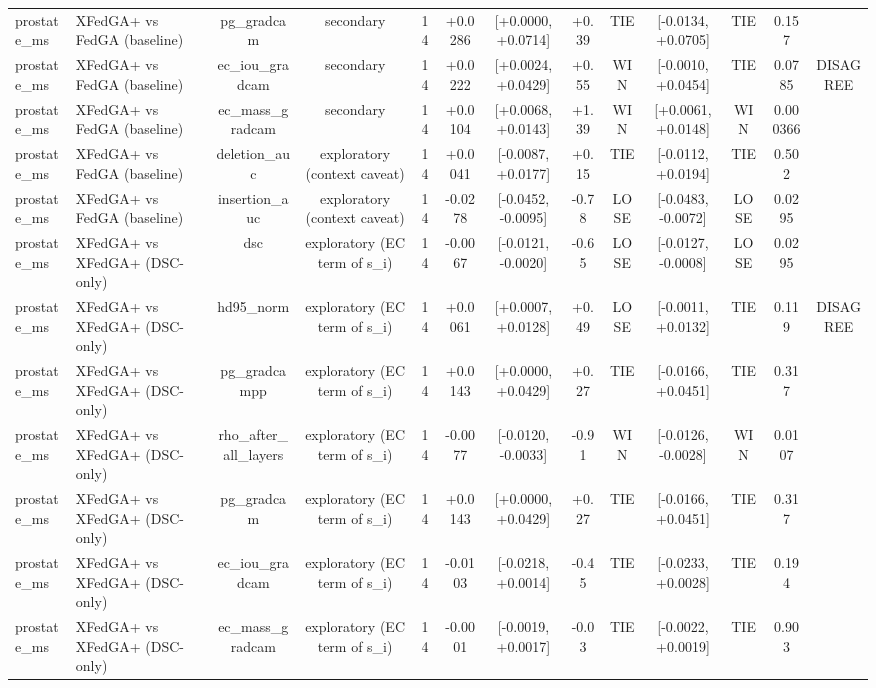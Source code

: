 \begin{tabular}{llccccccccccc}
prostate\_ms & XFedGA+ vs FedGA (baseline) & pg\_gradcam & secondary & 14 & +0.0286 & [+0.0000, +0.0714] & +0.39 & TIE & [-0.0134, +0.0705] & TIE & 0.157 &  \\
prostate\_ms & XFedGA+ vs FedGA (baseline) & ec\_iou\_gradcam & secondary & 14 & +0.0222 & [+0.0024, +0.0429] & +0.55 & WIN & [-0.0010, +0.0454] & TIE & 0.0785 & DISAGREE \\
prostate\_ms & XFedGA+ vs FedGA (baseline) & ec\_mass\_gradcam & secondary & 14 & +0.0104 & [+0.0068, +0.0143] & +1.39 & WIN & [+0.0061, +0.0148] & WIN & 0.000366 &  \\
prostate\_ms & XFedGA+ vs FedGA (baseline) & deletion\_auc & exploratory (context caveat) & 14 & +0.0041 & [-0.0087, +0.0177] & +0.15 & TIE & [-0.0112, +0.0194] & TIE & 0.502 &  \\
prostate\_ms & XFedGA+ vs FedGA (baseline) & insertion\_auc & exploratory (context caveat) & 14 & -0.0278 & [-0.0452, -0.0095] & -0.78 & LOSE & [-0.0483, -0.0072] & LOSE & 0.0295 &  \\
prostate\_ms & XFedGA+ vs XFedGA+ (DSC-only) & dsc & exploratory (EC term of s\_i) & 14 & -0.0067 & [-0.0121, -0.0020] & -0.65 & LOSE & [-0.0127, -0.0008] & LOSE & 0.0295 &  \\
prostate\_ms & XFedGA+ vs XFedGA+ (DSC-only) & hd95\_norm & exploratory (EC term of s\_i) & 14 & +0.0061 & [+0.0007, +0.0128] & +0.49 & LOSE & [-0.0011, +0.0132] & TIE & 0.119 & DISAGREE \\
prostate\_ms & XFedGA+ vs XFedGA+ (DSC-only) & pg\_gradcampp & exploratory (EC term of s\_i) & 14 & +0.0143 & [+0.0000, +0.0429] & +0.27 & TIE & [-0.0166, +0.0451] & TIE & 0.317 &  \\
prostate\_ms & XFedGA+ vs XFedGA+ (DSC-only) & rho\_after\_all\_layers & exploratory (EC term of s\_i) & 14 & -0.0077 & [-0.0120, -0.0033] & -0.91 & WIN & [-0.0126, -0.0028] & WIN & 0.0107 &  \\
prostate\_ms & XFedGA+ vs XFedGA+ (DSC-only) & pg\_gradcam & exploratory (EC term of s\_i) & 14 & +0.0143 & [+0.0000, +0.0429] & +0.27 & TIE & [-0.0166, +0.0451] & TIE & 0.317 &  \\
prostate\_ms & XFedGA+ vs XFedGA+ (DSC-only) & ec\_iou\_gradcam & exploratory (EC term of s\_i) & 14 & -0.0103 & [-0.0218, +0.0014] & -0.45 & TIE & [-0.0233, +0.0028] & TIE & 0.194 &  \\
prostate\_ms & XFedGA+ vs XFedGA+ (DSC-only) & ec\_mass\_gradcam & exploratory (EC term of s\_i) & 14 & -0.0001 & [-0.0019, +0.0017] & -0.03 & TIE & [-0.0022, +0.0019] & TIE & 0.903 &  \\

\end{tabular}
